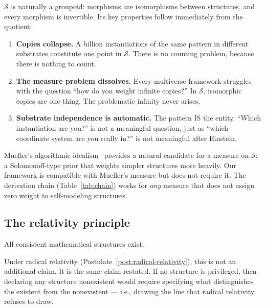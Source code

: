 $\mathcal{S}$ is naturally a groupoid: morphisms are isomorphisms
between structures, and every morphism is invertible.  Its key
properties follow immediately from the quotient:

\begin{enumerate}[nosep]
\item \textbf{Copies collapse.}  A billion instantiations of the same
  pattern in different substrates constitute one point in $\mathcal{S}$.
  There is no counting problem, because there is nothing to count.

\item \textbf{The measure problem dissolves.}  Every multiverse
  framework struggles with the question ``how do you weight infinite
  copies?''  In $\mathcal{S}$, isomorphic copies are one thing.  The
  problematic infinity never arises.

\item \textbf{Substrate independence is automatic.}  The pattern IS the
  entity.  ``Which instantiation are you?'' is not a meaningful
  question, just as ``which coordinate system are you really in?'' is
  not meaningful after Einstein.
\end{enumerate}

\begin{remark}
Mueller's algorithmic idealism~\citep{mueller2024} provides a
natural candidate for a measure on $\mathcal{S}$: a Solomonoff-type
prior that weights simpler structures more heavily.  Our framework
is compatible with Mueller's measure but does not require it.  The
derivation chain (Table~\ref{tab:chain}) works for \emph{any} measure
that does not assign zero weight to self-modeling structures.
\end{remark}

\subsection{The relativity principle}
\label{subsec:relativity-principle}

\begin{postulate}
\label{post:l4}
All consistent mathematical structures exist.
\end{postulate}

Under radical relativity (Postulate~\ref{post:radical-relativity}),
this is not an additional claim.  It is the same claim restated.  If
no structure is privileged, then declaring any structure nonexistent
would require specifying what distinguishes the existent from the
nonexistent --- i.e., drawing the line that radical relativity refuses
to draw.

